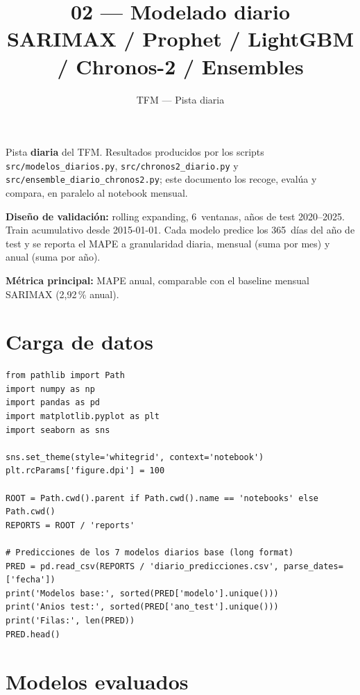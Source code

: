 \documentclass[12pt,a4paper]{article}
\title{\textbf{02 --- Modelado diario}\\
  \large SARIMAX / Prophet / LightGBM / Chronos-2 / Ensembles}
\author{TFM --- Pista diaria}
\date{}
\begin{document}
\maketitle
\tableofcontents
\vspace{1em}

\noindent
Pista \textbf{diaria} del TFM. Resultados producidos por los scripts
\texttt{src/modelos\_diarios.py}, \texttt{src/chronos2\_diario.py} y
\texttt{src/ensemble\_diario\_chronos2.py}; este documento los recoge,
evalúa y compara, en paralelo al notebook mensual.

\medskip
\noindent
\textbf{Diseño de validación:} rolling expanding, 6~ventanas, años de
test 2020--2025. Train acumulativo desde 2015-01-01. Cada modelo predice
los 365~días del año de test y se reporta el MAPE a granularidad diaria,
mensual (suma por mes) y anual (suma por año).

\medskip
\noindent
\textbf{Métrica principal:} MAPE anual, comparable con el baseline mensual
SARIMAX (2{,}92\,\% anual).

\section{Carga de datos}

\begin{lstlisting}[caption={Importaciones y carga de predicciones base}]
from pathlib import Path
import numpy as np
import pandas as pd
import matplotlib.pyplot as plt
import seaborn as sns

sns.set_theme(style='whitegrid', context='notebook')
plt.rcParams['figure.dpi'] = 100

ROOT = Path.cwd().parent if Path.cwd().name == 'notebooks' else Path.cwd()
REPORTS = ROOT / 'reports'

# Predicciones de los 7 modelos diarios base (long format)
PRED = pd.read_csv(REPORTS / 'diario_predicciones.csv', parse_dates=['fecha'])
print('Modelos base:', sorted(PRED['modelo'].unique()))
print('Anios test:', sorted(PRED['ano_test'].unique()))
print('Filas:', len(PRED))
PRED.head()
\end{lstlisting}

\section{Modelos evaluados}
\end{document}

